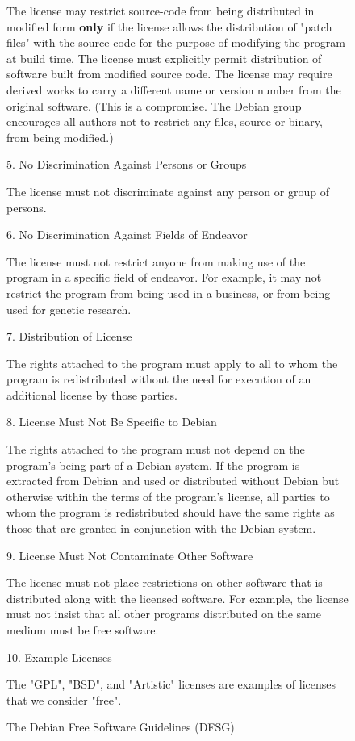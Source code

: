 \documentclass[mingoth,a4paper]{jsarticle}
\begin{document}
{{{\begin{figure}[h]
\begin{multicols}{2}
{       The license may restrict source-code from being distributed in
       modified form {\bf only} if the license allows the distribution of
       "patch files" with the source code for the purpose of modifying
       the program at build time. The license must explicitly permit
       distribution of software built from modified source code. The
       license may require derived works to carry a different name or
       version number from the original software. (This is a compromise.
       The Debian group encourages all authors not to restrict any files,
       source or binary, from being modified.)

    5. No Discrimination Against Persons or Groups

       The license must not discriminate against any person or group of
       persons.

    6. No Discrimination Against Fields of Endeavor

       The license must not restrict anyone from making use of the
       program in a specific field of endeavor. For example, it may not
       restrict the program from being used in a business, or from being
       used for genetic research.

    7. Distribution of License

       The rights attached to the program must apply to all to whom the
       program is redistributed without the need for execution of an
       additional license by those parties.

    8. License Must Not Be Specific to Debian

       The rights attached to the program must not depend on the
       program's being part of a Debian system. If the program is
       extracted from Debian and used or distributed without Debian but
       otherwise within the terms of the program's license, all parties
       to whom the program is redistributed should have the same rights
       as those that are granted in conjunction with the Debian system.

    9. License Must Not Contaminate Other Software

       The license must not place restrictions on other software that is
       distributed along with the licensed software. For example, the
       license must not insist that all other programs distributed on the
       same medium must be free software.

   10. Example Licenses

       The "GPL", "BSD", and "Artistic" licenses are examples of licenses
       that we consider "free".
 }
 \end{multicols}
\caption{The Debian Free Software Guidelines (DFSG)}
\label{fig:dfsg}
\end{figure}


}}}
\end{document}
